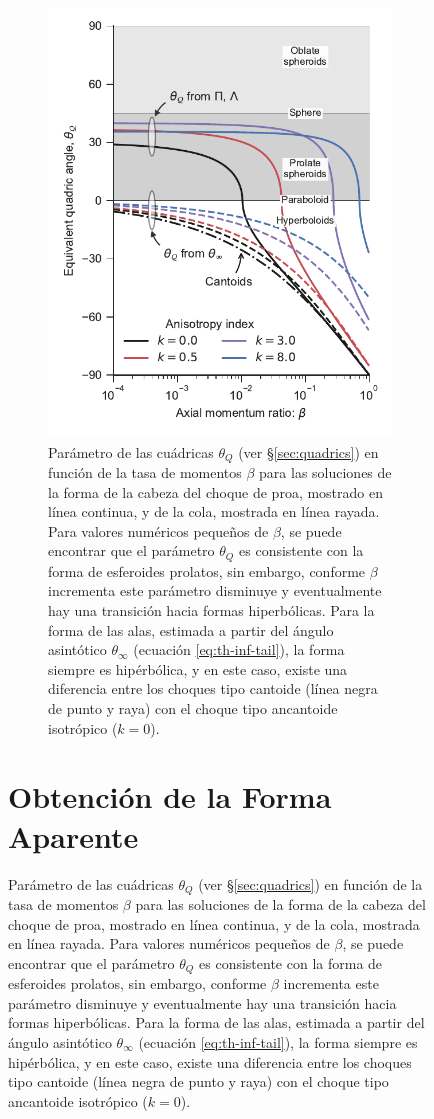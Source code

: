 \begin{figure}
\begin{figure}
  \centering
  \includegraphics[width=0.8\linewidth]{./Figures/ancantoid-angles}
  \caption[Parámetro de las cuádricas $\theta_Q$ que ajusta a la forma de la cabeza y la cola de las soluciones del modelo de capa delgada.]{Parámetro de las cuádricas $\theta_Q$ (ver \S \ref{sec:quadrics}) en función de la tasa de momentos $\beta$ para las soluciones de la forma de la cabeza del choque de proa, mostrado en línea continua, y de la cola, mostrada en línea rayada. Para valores numéricos pequeños de $\beta$, se puede encontrar que el parámetro $\theta_Q$ es consistente con la forma de esferoides prolatos, sin embargo, conforme $\beta$ incrementa este parámetro disminuye y eventualmente hay una transición hacia formas hiperbólicas. Para la forma de las alas, estimada a partir del ángulo asintótico $\theta_\infty$ (ecuación \ref{eq:th-inf-tail}), la forma siempre es hipérbólica, y en este caso, existe una diferencia entre los choques tipo cantoide (línea negra de punto y raya) con el choque tipo ancantoide isotrópico ($k=0$).}
  \label{fig:thq-beta}
\end{figure}

\section[Forma Aparente]{Obtención de la Forma Aparente}


\end{figure}
